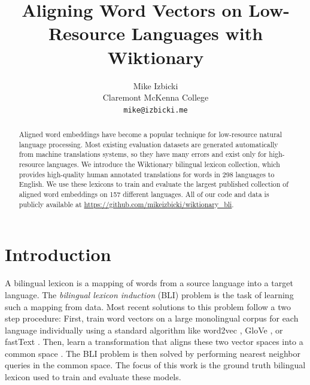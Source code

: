 \documentclass[11pt]{article}
\title{Aligning Word Vectors on Low-Resource Languages with Wiktionary}
\author{Mike Izbicki \\
  Claremont McKenna College \\
  \texttt{mike@izbicki.me}}
\newcommand{\fixme}[1]{\textbf{FIXME: {#1}}}
\begin{document}
\maketitle
\begin{abstract}
    Aligned word embeddings have become a popular technique for low-resource natural language processing.
    Most existing evaluation datasets are generated automatically from machine translations systems,
    so they have many errors and exist only for high-resource languages.
    We introduce the Wiktionary bilingual lexicon collection,
    which provides high-quality human annotated translations for words in 298 languages to English.
    We use these lexicons to train and evaluate the largest published collection of aligned word embeddings on 157 different languages.
    All of our code and data is publicly available at \url{https://github.com/mikeizbicki/wiktionary_bli}.
\end{abstract}


\section{Introduction}

A bilingual lexicon is a mapping of words from a source language into a target language.
The \emph{bilingual lexicon induction} (BLI) problem is the task of learning such a mapping from data.
Most recent solutions to this problem follow a two step procedure:
First, train word vectors on a large monolingual corpus for each language individually using a standard algorithm like word2vec \citep{mikolov2013efficient}, GloVe \cite{pennington2014glove}, or fastText \citep{bojanowski2017enriching}.
Then, learn a transformation that aligns these two vector spaces into a common space \citep[e.g.][]{mikolov2013exploiting,xing2015normalized,joulin2018loss,artetxe2018generalizing,zhang2019girls,glavas2019properly,vulic2019we}.
The BLI problem is then solved by performing nearest neighbor queries in the common space.
The focus of this work is the ground truth bilingual lexicon used to train and evaluate these models.
\end{document}
